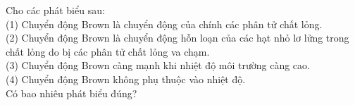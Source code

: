 \begin{bt}
	{\color{red}\footnotesize\ttfamily [L12C1B1-TLN-2]}\par %
	Cho các phát biểu sau:\\
	(1) Chuyển động Brown là chuyển động của chính các phân tử chất lỏng.\\
	(2) Chuyển động Brown là chuyển động hỗn loạn của các hạt nhỏ lơ lửng trong chất lỏng do bị các phân tử chất lỏng va chạm.\\
	(3) Chuyển động Brown càng mạnh khi nhiệt độ môi trường càng cao.\\
	(4) Chuyển động Brown không phụ thuộc vào nhiệt độ.\\
	Có bao nhiêu phát biểu đúng?
\end{bt}

